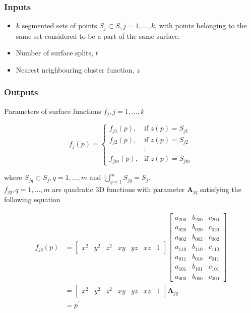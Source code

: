 \documentclass[12pt,a4paper]{article}
\begin{document}
    \subsubsection{Inputs}
    \begin{itemize}
        \itemsep0em
        \item $k$ segmented sets of points $S_j \subset S, j=1,\dots,k$, with points belonging to the same set considered to be a part of the same surface.
        \item Number of surface splits, $t$
        \item Nearest neighbouring cluster function, $z$
    \end{itemize}
    
    
    \subsubsection{Outputs}
    Parameters of surface functions $f_j, j=1,\dots,k$
    
    \[
    f_{j}(p)=\left\{\begin{array}{ll}{f_{j1}(p),}&{\text{if } z(p)=S_{j1}}\\{f_{j2}(p),}&{\text{if }z(p)=S_{j2}}\\{}&{\vdots}\\{f_{jm}(p),}&{\text{if }z(p)=S_{jm}}\end{array}\right.
    \]
    
    \noindent where $S_{jq} \subset S_{j}, q=1,\dots,m$ and $\bigcup\limits_{q=1}^{m} {S_{jq}} = S_j$.\\
    \noindent $f_{jq},q=1,\dots,m$ are quadratic 3D functions with parameter $\textbf{A}_{jq}$ satisfying the following equation
    
    \begin{equation}
    \begin{split}
    f_{jq}(p) & =
    \left[\begin{array}{ccccccc}{x^{2}}&{y^{2}}&{z^{2}}&{xy}&{yz}&{xz}&{1}\end{array}\right]
    \left[\begin{array}{ccc}a_{200}&b_{200}&c_{200}\\a_{020}&b_{020}&c_{020}\\a_{002}&b_{002}&c_{002}\\a_{110}& b_{110}& c_{110}\\a_{011}&b_{010}&c_{011}\\a_{101}&b_{101}&c_{101}\\a_{000}&b_{000}&c_{000}\end{array}\right]\\
    & = \left[\begin{array}{ccccccc}{x^{2}}&{y^{2}}&{z^{2}}&{xy}&{yz}&{xz}&{1}\end{array}\right] \textbf{A}_{jq}\\
    & = p^\prime
    \end{split}
    \end{equation}
    
\end{document}

